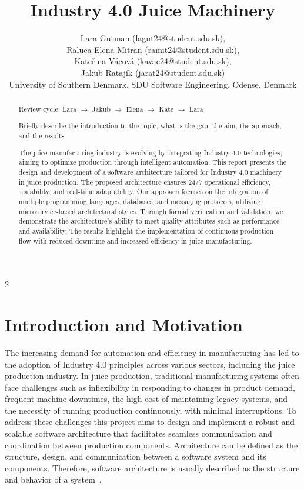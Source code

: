 \documentclass{article}
\title{Industry 4.0 Juice Machinery}
\author{Lara Gutman (lagut24@student.sdu.sk), \\ 
Raluca-Elena Mitran (ramit24@student.sdu.sk),\\ 
Kateřina Vácová (kavac24@student.sdu.sk), \\ 
Jakub Ratajík (jarat24@student.sdu.sk)\\
University of Southern Denmark, SDU Software Engineering, Odense, Denmark}
\begin{document}
\maketitle

\begin{multicols}{2}

\begin{abstract}
\color{green}
Review cycle: Lara $\rightarrow$ Jakub $\rightarrow$ Elena $\rightarrow$ Kate $\rightarrow$ Lara

\color{blue}
Briefly describe the introduction to the topic, what is the gap, the aim, the approach, and the results


\color{black}
The juice manufacturing industry is evolving by integrating Industry 4.0 technologies, aiming to optimize production through intelligent automation. This report presents the design and development of a software architecture tailored for Industry 4.0 machinery in juice production. The proposed architecture ensures 24/7 operational efficiency, scalability, and real-time adaptability. Our approach focuses on the integration of multiple programming languages, databases, and messaging protocols, utilizing microservice-based architectural styles. Through formal verification and validation, we demonstrate the architecture's ability to meet quality attributes such as performance and availability. The results highlight the implementation of continuous production flow with reduced downtime and increased efficiency in juice manufacturing.
\end{abstract}


\section{Introduction and Motivation}
\color{blue}


\color{black}

The increasing demand for automation and efficiency in manufacturing has led to the adoption of Industry 4.0 principles across various sectors, including the juice production industry.
In juice production, traditional manufacturing systems often face challenges such as inflexibility in responding to changes in product demand, frequent machine downtimes, the high cost of maintaining legacy systems, and the necessity of running production continuously, with minimal interruptions.
To address these challenges this project aims to design and implement a robust and scalable software architecture that facilitates seamless communication and coordination between production components. Architecture can be defined as the structure, design, and communication between a software system and its components. Therefore, software architecture is usually described as the structure and behavior of a system~\cite{b12}.


\end{multicols}
\end{document}
